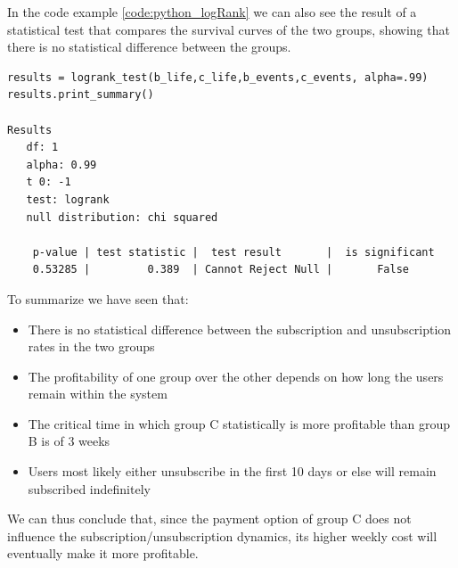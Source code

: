 \documentclass[paper=a4, fontsize=10pt]{report}
\begin{document}
In the code example \ref{code:python_logRank} we can also see the result of a statistical test
that compares the survival curves of the two groups, showing that there is no statistical difference between the groups.
\scriptsize
\begin{lstlisting}[frame=single,caption=LogRank test \label{code:python_logRank}]
results = logrank_test(b_life,c_life,b_events,c_events, alpha=.99)
results.print_summary()

Results
   df: 1
   alpha: 0.99
   t 0: -1
   test: logrank
   null distribution: chi squared

    p-value | test statistic |  test result       |  is significant
    0.53285 |         0.389  | Cannot Reject Null |       False       

\end{lstlisting}

\normalsize
To summarize we have seen that:
\begin{itemize}
 \item There is no statistical difference between the subscription and unsubscription rates in the two groups
 \item The profitability of one group over the other depends on how long the users remain within the system
 \item The critical time in which group C statistically is more profitable than group B is of 3 weeks
 \item Users most likely either unsubscribe in the first 10 days or else will remain subscribed indefinitely
\end{itemize}

We can thus conclude that, since the payment option of group C does not influence the subscription/unsubscription dynamics, its
higher weekly cost will eventually make it more profitable.
\end{document}
